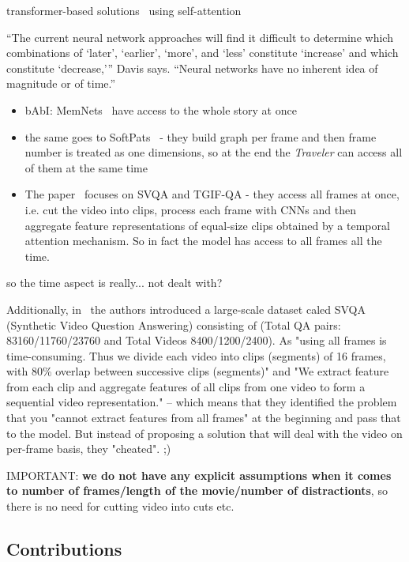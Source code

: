 transformer-based solutions~\cite{vaswani2017attention} using self-attention


“The current neural network approaches will find it difficult to determine which combinations of ‘later’, ‘earlier’, ‘more’, and ‘less’ constitute ‘increase’ and which constitute ‘decrease,'” Davis says. “Neural networks have no inherent idea of magnitude or of time.”
~\cite{davis2016write}





\begin{itemize}
\item bAbI:  MemNets~\cite{weston2014memory} have access to the whole story at once
\item the same goes to SoftPats~\cite{haurilet2019s} - they build graph per frame and then frame number is treated as one dimensions, so at the end the \textit{Traveler} can access all of them at the same time 
\item The paper~\cite{le2019learning} focuses on SVQA and TGIF-QA -  they access all frames at once, i.e. cut the video into clips, process each frame with CNNs and then aggregate feature representations of equal-size clips obtained by a temporal attention mechanism. So in fact the model has access to all frames all the time.
\end{itemize}
so the time aspect is really... not dealt with?

Additionally, in~\cite{song2018explore} the authors introduced a large-scale dataset caled SVQA (Synthetic Video Question Answering) consisting of (Total QA pairs: 83160/11760/23760 and Total Videos 8400/1200/2400).
As "using all frames is time-consuming. Thus we divide each video into clips (segments) of 16 frames, with 80\% overlap between successive clips (segments)" and "We extract feature from each clip and aggregate features of all clips from one video to form a sequential video representation." -- which means that they identified the problem that you "cannot extract features from all frames" at the beginning and pass that to the model. But instead of proposing a solution that will deal with the video on per-frame basis, they "cheated". ;)

IMPORTANT: \textbf{we do not have any explicit assumptions when it comes to number of frames/length of the movie/number of distractionts}, so there is no need for cutting video into cuts etc.

\subsection{Contributions}

